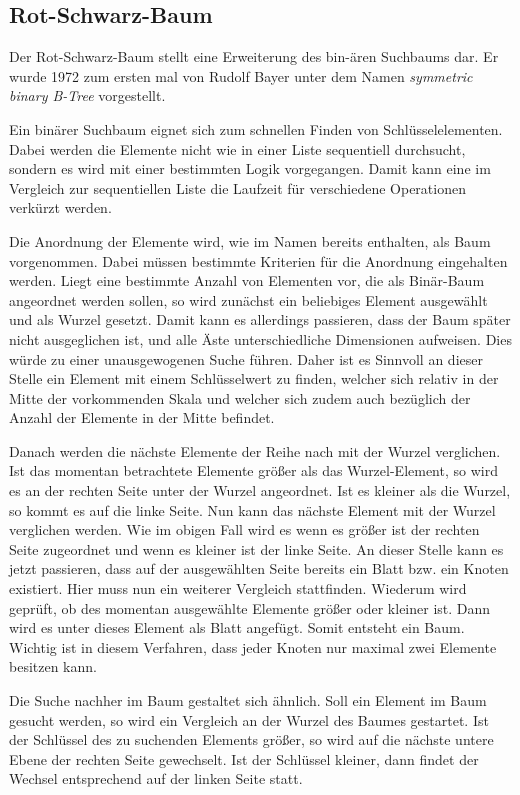 \subsection{Rot-Schwarz-Baum}
Der Rot-Schwarz-Baum stellt eine Erweiterung des bin-ären Suchbaums dar. Er wurde 1972 zum ersten mal von Rudolf Bayer unter dem Namen  \textit{symmetric binary B-Tree} vorgestellt.

Ein binärer Suchbaum eignet sich zum schnellen Finden von Schlüsselelementen. Dabei werden die Elemente nicht wie in einer Liste sequentiell durchsucht, sondern es wird mit einer bestimmten Logik vorgegangen.
Damit kann eine im Vergleich zur sequentiellen Liste die Laufzeit für verschiedene Operationen verkürzt werden.

Die Anordnung der Elemente wird, wie im Namen bereits enthalten, als Baum vorgenommen. Dabei müssen bestimmte Kriterien für die Anordnung eingehalten werden. Liegt eine bestimmte Anzahl von Elementen vor, die als Binär-Baum angeordnet werden sollen, so wird zunächst ein beliebiges Element ausgewählt und als Wurzel gesetzt. Damit kann es allerdings passieren, dass der Baum später nicht ausgeglichen ist, und alle Äste unterschiedliche Dimensionen aufweisen. Dies würde zu einer unausgewogenen Suche führen. Daher ist es Sinnvoll an dieser Stelle ein Element mit einem Schlüsselwert zu finden, welcher sich relativ in der Mitte der vorkommenden Skala und welcher sich zudem auch bezüglich der Anzahl der Elemente in der Mitte befindet.

Danach werden die nächste Elemente der Reihe nach mit der Wurzel verglichen. Ist das momentan betrachtete Elemente größer als das Wurzel-Element, so wird es an der rechten Seite unter der Wurzel angeordnet. Ist es kleiner als die Wurzel, so kommt es auf die linke Seite. Nun kann das nächste Element mit der Wurzel verglichen werden. Wie im obigen Fall wird es wenn es größer ist der rechten Seite zugeordnet und wenn es kleiner ist der linke Seite. An dieser Stelle kann es jetzt passieren, dass auf der ausgewählten Seite bereits ein Blatt bzw. ein Knoten existiert. Hier muss nun ein weiterer Vergleich stattfinden. Wiederum wird geprüft, ob des momentan ausgewählte Elemente größer oder kleiner ist. Dann wird es unter dieses Element als Blatt angefügt. Somit entsteht ein Baum. Wichtig ist in diesem Verfahren, dass jeder Knoten nur maximal zwei Elemente besitzen kann. 

Die Suche nachher im Baum gestaltet sich ähnlich. Soll ein Element im Baum gesucht werden, so wird ein Vergleich an der Wurzel des Baumes gestartet. Ist der Schlüs\-sel des zu suchenden Elements größer, so wird auf die nächste untere Ebene der rechten Seite gewechselt. Ist der Schlüssel kleiner, dann findet der Wechsel entsprechend auf der linken Seite statt. 


